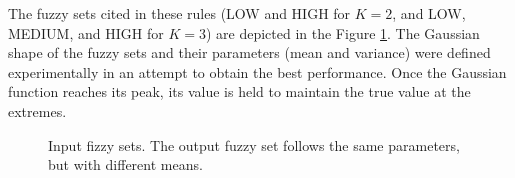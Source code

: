 \documentclass[english]{sobraep}
\begin{document}
The fuzzy sets cited in these rules (LOW and HIGH for \(K=2\), and LOW, MEDIUM, and HIGH for \(K=3\)) are depicted in the Figure \ref{fig:input-fuzzy-sets}. The Gaussian shape of the fuzzy sets and their parameters (mean and variance) were defined experimentally in an attempt to obtain the best performance. Once the Gaussian function reaches its peak, its value is held to maintain the true value at the extremes.
\begin{figure}[htp]
    
    
    \caption{Input fizzy sets. The output fuzzy set follows the same parameters, but with different means.}
    \label{fig:input-fuzzy-sets}
\end{figure}
\end{document}
